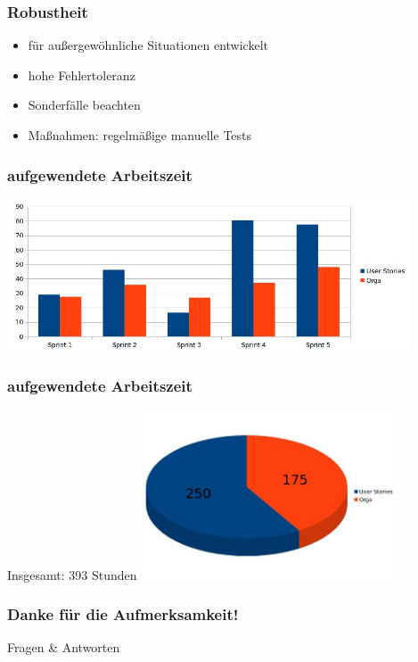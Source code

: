 \documentclass[accentcolor=tud4c,colorbacktitle]{tudbeamer}
\begin{document}
  \begin{frame}
    \frametitle{Robustheit}
    \begin{itemize}
      \item für außergewöhnliche Situationen entwickelt
      \item hohe Fehlertoleranz
      \item Sonderfälle beachten
    \end{itemize}
    \begin{itemize}
      \item Maßnahmen: regelmäßige manuelle Tests
    \end{itemize}
  \end{frame}

  \begin{frame}
    \frametitle{aufgewendete Arbeitszeit}
    \begin{center}
      \includegraphics[height=4.5cm]{zeiten.jpg}
    \end{center}
  \end{frame}

  \begin{frame}
    \frametitle{aufgewendete Arbeitszeit}
    \begin{center}
      \huge{Insgesamt: 393 Stunden}
      \includegraphics[height=5cm]{zeiten2.jpg}
    \end{center}
  \end{frame}


  \begin{frame}
    \frametitle{Danke für die Aufmerksamkeit!}
    \vspace{2cm}
    \begin{center}
      \huge{Fragen \& Antworten}
    \end{center}
  \end{frame}
\end{document}
